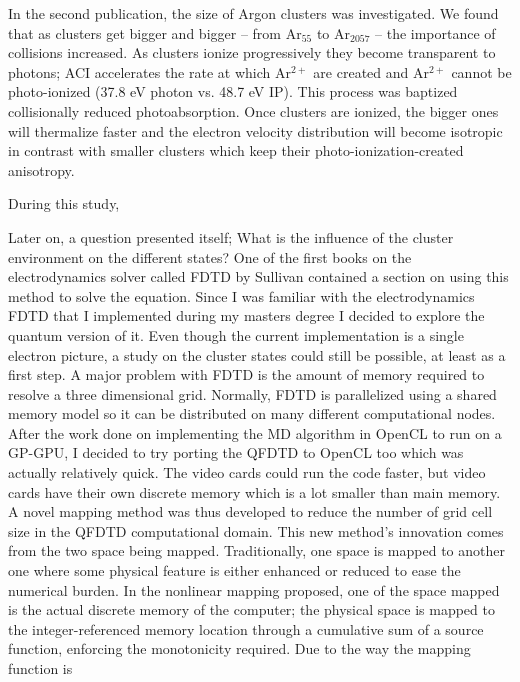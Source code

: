 In the second publication, the size of Argon clusters was investigated. We found
that as clusters get bigger and bigger -- from Ar$_{55}$ to Ar$_{2057}$ --
the importance of collisions increased. As clusters ionize progressively they
become transparent to photons; ACI accelerates the rate at which Ar$^{2+}$ are
created and Ar$^{2+}$ cannot be photo-ionized (37.8 eV photon vs. 48.7 eV IP).
This process was baptized collisionally reduced photoabsorption. Once clusters
are ionized, the bigger ones will thermalize faster and the electron velocity
distribution will become isotropic in contrast with smaller clusters which
keep their photo-ionization-created anisotropy.

During this study, 


Later on, a question presented itself; What is the influence of the cluster
environment on the different states? One of the first books on the
electrodynamics solver called FDTD by Sullivan contained a section on using
this method to solve the \schrodinger equation. Since I was familiar with
the electrodynamics FDTD that I implemented during my masters degree I decided
to explore the quantum version of it. Even though the current implementation is
a single electron picture, a study on the cluster states could still be possible,
at least as a first step. A major problem with FDTD is the amount of memory
required to resolve a three dimensional grid. Normally, FDTD is parallelized
using a shared memory model so it can be distributed on many different
computational nodes. After the work done on implementing the MD algorithm in
OpenCL to run on a GP-GPU, I decided to try porting the QFDTD to OpenCL too
which was actually relatively quick. The video cards could run the code faster,
but video cards have their own discrete memory which is a lot smaller than main
memory. A novel mapping method was thus developed to reduce the number of grid
cell size in the QFDTD computational domain. This new method's innovation comes
from the two space being mapped. Traditionally, one space is mapped to another
one where some physical feature is either enhanced or reduced to ease the numerical
burden. In the nonlinear mapping proposed, one of the space mapped is the actual
discrete memory of the computer; the physical space is mapped to the
integer-referenced memory location through a cumulative sum of a source function,
enforcing the monotonicity required. Due to the way the mapping function is
